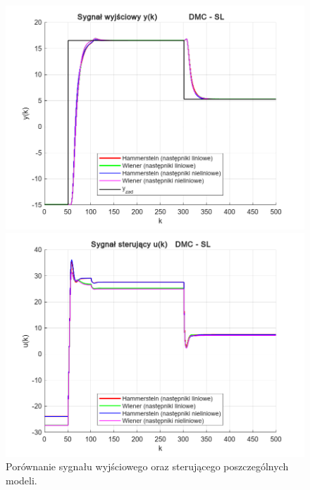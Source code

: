 \documentclass[a4paper,titlepage,11pt,floatssmall]{mwrep}
\begin{document}
\begin{figure}[p]
\centering
\begin{minipage}{0.495\linewidth}
    \centering
    \includegraphics[width=1.1\linewidth]{pictures/DMC_sl_y}
\end{minipage}
\hfill
\begin{minipage}{0.495\linewidth}
    \centering
    \includegraphics[width=1.1\linewidth]{pictures/DMC_sl_u}
\end{minipage}

\caption{Porównanie sygnału wyjściowego oraz sterującego poszczególnych modeli.}

\vspace{2cm} 


\end{figure}
\end{document}
